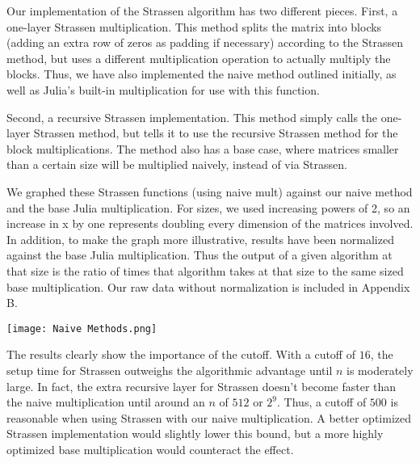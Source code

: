 \documentclass{article}         %
\begin{document}
    Our implementation of the Strassen algorithm has two different pieces. First, a one-layer Strassen multiplication. This method splits the matrix into blocks (adding an extra row of zeros as padding if necessary) according to the Strassen method, but uses a different multiplication operation to actually multiply the blocks. Thus, we have also implemented the naive method outlined initially, as well as Julia's built-in multiplication for use with this function.

Second, a recursive Strassen implementation. This method simply calls the one-layer Strassen method, but tells it to use the recursive Strassen method for the block multiplications. The method also has a base case, where matrices smaller than a certain size will be multiplied naively, instead of via Strassen.

We graphed these Strassen functions (using naive mult) against our naive method and the base Julia multiplication. For sizes, we used increasing powers of 2, so an increase in x by one represents doubling every dimension of the matrices involved. In addition, to make the graph more illustrative, results have been normalized against the base Julia multiplication. Thus the output of a given algorithm at that size is the ratio of times that algorithm takes at that size to the same sized base multiplication. Our raw data without normalization is included in Appendix B.

\texttt{[image: Naive Methods.png]}

The results clearly show the importance of the cutoff. With a cutoff of $16$, the setup time for Strassen outweighs the algorithmic advantage until $n$ is moderately large. In fact, the extra recursive layer for Strassen doesn't become faster than the naive multiplication until around an $n$ of $512$ or $2^9$. Thus, a cutoff of $500$ is reasonable when using Strassen with our naive multiplication. A better optimized Strassen implementation would slightly lower this bound, but a more highly optimized base multiplication would counteract the effect. 
\end{document}
